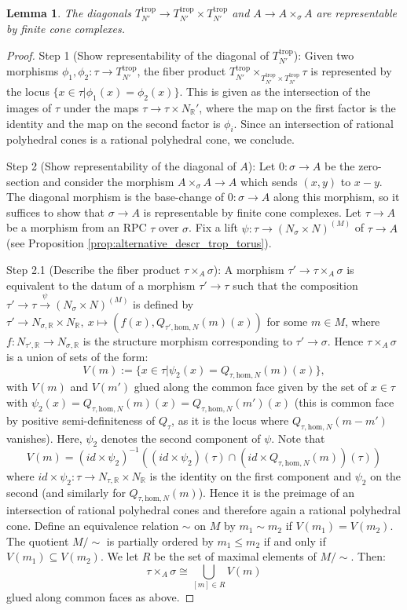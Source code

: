 \documentclass[11pt]{amsart}
\newtheorem{lemma}[theorem]{Lemma}
\theoremstyle{definition}
\theoremstyle{remark}
\def\hom{\mathrm{hom}}
\def\trop{\mathrm{trop}}
\begin{document}
\begin{lemma}
	\label{lem:diag_repr}
	The diagonals $T_{N'}^{\trop}\to T_{N'}^{\trop}\times T_{N'}^{\trop}$ and
	$A\to A\times_{\sigma}A$ are representable by finite cone complexes.
\end{lemma}

\begin{proof}
	Step 1 (Show representability of the diagonal of $T_{N'}^{\trop}$): Given two morphisms
	$\phi_1,\phi_2:\tau\to T_{N'}^{\trop}$, the fiber product $T_{N'}^{\trop}\times_{T_{N'}^{\trop}\times T_{N'}^{\trop}}\tau$
	is represented by the locus $\{x\in \tau|\phi_1(x)=\phi_2(x)\}$. This
	is given as the intersection of the images of $\tau$ under the maps
	$\tau\to \tau\times N_{\mathbb{R}}'$, where the map on the first factor is the identity
	and the map on the second factor is $\phi_i$. Since an intersection of rational
	polyhedral cones is a rational polyhedral cone, we conclude.

	Step 2 (Show representability of the diagonal of $A$): Let $0:\sigma\to A$ be the zero-section and consider the morphism
	$A\times_{\sigma}A\to A$ which sends $(x,y)$ to $x-y$. The diagonal
	morphism is the base-change of $0:\sigma\to A$ along this morphism, so
	it suffices to show that $\sigma\to A$ is representable by finite
	cone complexes. Let $\tau\to A$ be a morphism from an RPC $\tau$
	over $\sigma$. Fix a lift $\psi:\tau\to (N_{\sigma}\times N)^{(M)}$
	of $\tau\to A$ (see Proposition \ref{prop:alternative_descr_trop_torus}).

	Step 2.1 (Describe the fiber product $\tau\times_{A}\sigma$):
	A morphism $\tau'\to \tau\times_A \sigma$ is equivalent to the
	datum of a morphism $\tau'\to \tau$ such that the composition $\tau'\to \tau\xrightarrow{\psi} (N_{\sigma}\times N)^{(M)}$
	is defined by $\tau'\to N_{\sigma,\mathbb{R}}\times N_{\mathbb{R}},\ x\mapsto (f(x),Q_{\tau',\hom,N}(m)(x))$
	for some $m\in M$,
	where $f:N_{\tau',\mathbb{R}}\to N_{\sigma,\mathbb{R}}$ is the
	structure morphism corresponding to $\tau'\to \sigma$.
	Hence $\tau\times_A \sigma$ is a union of sets
	of the form:
	$$V(m):=\{x\in \tau|\psi_2(x)=Q_{\tau,\hom,N}(m)(x)\},$$
	with $V(m)$ and $V(m')$ glued along the common face given by the set of $x\in \tau$
	with $\psi_2(x)=Q_{\tau,\hom,N}(m)(x)=Q_{\tau,\hom,N}(m')(x)$ (this is common face by positive semi-definiteness
	of $Q_{\tau}$, as it is the locus where $Q_{\tau,\hom,N}(m-m')$ vanishes).
	Here, $\psi_2$ denotes the second component of $\psi$. Note that
	$$V(m)=(id\times\psi_2)^{-1}((id\times\psi_2)(\tau)\cap (id\times Q_{\tau,\hom,N}(m))(\tau))$$
	where $id\times \psi_2:{\tau}\to N_{\tau,\mathbb{R}}\times N_{\mathbb{R}}$
	is the identity on the first component and $\psi_2$ on the second
	(and similarly for $Q_{\tau,\hom,N}(m)$). Hence it is the preimage
	of an intersection of rational polyhedral cones and therefore
	again a rational polyhedral cone. Define an equivalence relation $\sim$ on $M$ by
	$m_1\sim m_2$ if $V(m_1)=V(m_2)$. The quotient $M/\sim$ is partially
	ordered by $m_1\le m_2$ if and only if $V(m_1)\subseteq V(m_2)$.
	We let $R$ be the set of maximal elements of $M/\sim$. Then:
	$$\tau\times_A \sigma\cong \bigcup_{[m]\in R}V(m)$$
	glued along common faces as above.


\end{proof}
\end{document}

